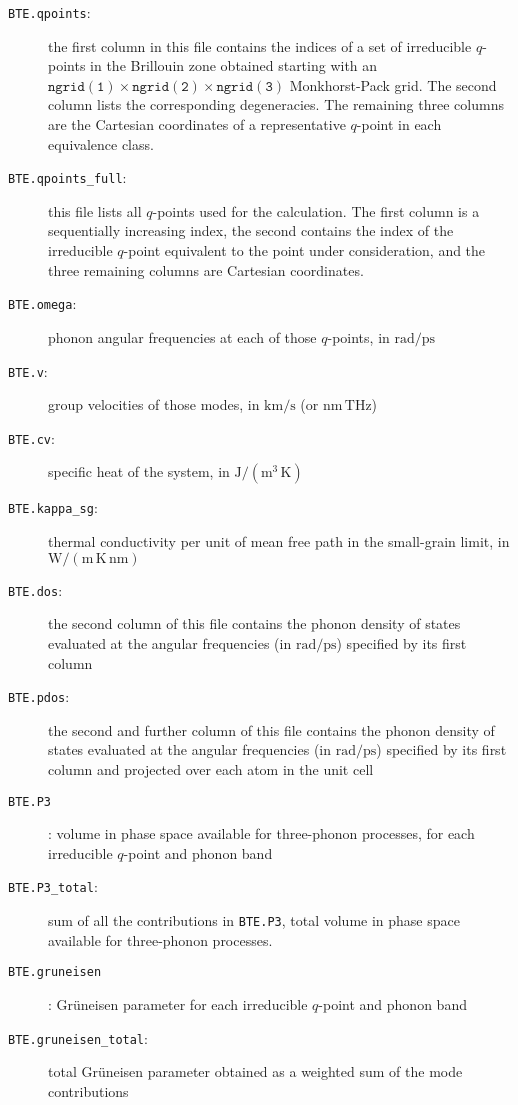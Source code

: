 \documentclass[a4paper,10pt,english]{article}
\begin{document}
\begin{description}
\item[\texttt{BTE.qpoints}:] the first column in this file contains the indices of a set of irreducible $q$-points in the Brillouin zone obtained starting with an $\mathtt{ngrid\left(1\right)}\times\mathtt{ngrid\left(2\right)}\times\mathtt{ngrid\left(3\right)}$ Monkhorst-Pack grid. The second column lists the corresponding degeneracies. The remaining three columns are the Cartesian coordinates of a representative $q$-point in each equivalence class.
\item[\texttt{BTE.qpoints_full}:] this file lists all $q$-points used for the calculation. The first column is a sequentially increasing index, the second contains the index of the irreducible $q$-point equivalent to the point under consideration, and the three remaining columns are Cartesian coordinates.
\item[\texttt{BTE.omega}:] phonon angular frequencies at each of those $q$-points, in $\mathrm{rad/ps}$
\item[\texttt{BTE.v}:] group velocities of those modes, in $\mathrm{km/s}$ (or $\mathrm{nm}\,\mathrm{THz}$)
\item[\texttt{BTE.cv}:] specific heat of the system, in $\mathrm{J/\left(m^3\,K\right)}$
\item[\texttt{BTE.kappa\_sg}:] thermal conductivity per unit of mean free path in the small-grain limit, in $\mathrm{W/\left(m\,K\,nm\right)}$
\item[\texttt{BTE.dos}:] the second column of this file contains the phonon density of states evaluated at the angular frequencies (in $\mathrm{rad/ps}$) specified by its first column
\item[\texttt{BTE.pdos}:] the second and further column of this file contains the phonon density of states evaluated at the angular frequencies (in $\mathrm{rad/ps}$) specified by its first column and projected over each atom in the unit cell
\item[\texttt{BTE.P3}]: volume in phase space available for three-phonon processes, for each irreducible $q$-point and phonon band
\item[\texttt{BTE.P3\_total}:] sum of all the contributions in \texttt{BTE.P3}, total volume in phase space available for three-phonon processes.
\item[\texttt{BTE.gruneisen}]: Gr\"uneisen parameter for each irreducible $q$-point and phonon band
\item[\texttt{BTE.gruneisen\_total}:] total Gr\"uneisen parameter obtained as a weighted sum of the mode contributions

\end{description}
\end{document}
